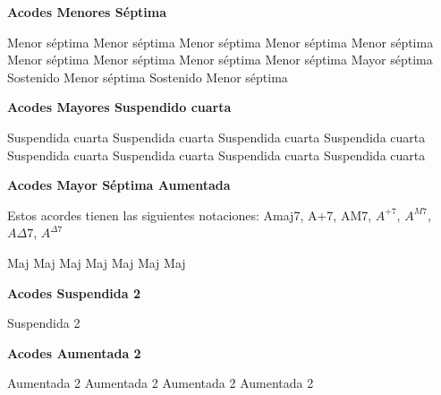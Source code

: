 \textbf{Acodes Menores S\'eptima}
\vskip 25pt

\small
{} Menor s\'eptima \qquad\qquad
{} Menor s\'eptima \qquad\qquad
{} Menor s\'eptima
\vskip 25pt
 Menor s\'eptima \qquad\qquad
{} Menor s\'eptima \qquad\qquad
{} Menor s\'eptima
\vskip 25pt
 Menor s\'eptima \qquad\qquad
{} Menor s\'eptima \qquad\qquad
{} Menor s\'eptima
\vskip 25pt
 Mayor s\'eptima \qquad\qquad
{} Sostenido Menor s\'eptima \qquad\qquad
{} Sostenido Menor s\'eptima
\normalsize

\vskip 20pt

\textbf{Acodes Mayores Suspendido cuarta}
\vskip 25pt

\small
{} Suspendida cuarta  \qquad\qquad
{} Suspendida cuarta \qquad\qquad
{} Suspendida cuarta
\vskip 25pt
 Suspendida cuarta \qquad\qquad
{} Suspendida cuarta \qquad\qquad
{} Suspendida cuarta
\vskip 25pt
 Suspendida cuarta \qquad\qquad
{} Suspendida cuarta
\normalsize

\vskip 20pt
\textbf{Acodes Mayor S\'eptima Aumentada}
\vskip 25pt

Estos acordes tienen las siguientes notaciones:
Amaj7, A+7, AM7, $A^{+7}$, $A^{M7}$, $A\Delta7$, $A^{\Delta7}$\break
\vskip 20pt

\small
{} Maj \hfill
{} Maj \hfill
{} Maj \hfill\null\break
\vskip 20pt
 Maj \hfill
{} Maj \hfill
{} Maj \hfill\null\break
\vskip 20pt
 Maj \hfill\null\break
\normalsize

\vskip 20pt
\textbf{Acodes Suspendida 2}
\vskip 25pt

\small
{} Suspendida 2
\normalsize

\vskip 20pt
\textbf{Acodes Aumentada 2}
\vskip 25pt

\small
{} Aumentada 2 \hfill
{} Aumentada 2 \hfill
{} Aumentada 2 \hfill\null\break
\vskip 20pt
 Aumentada 2 \hfill
\normalsize



